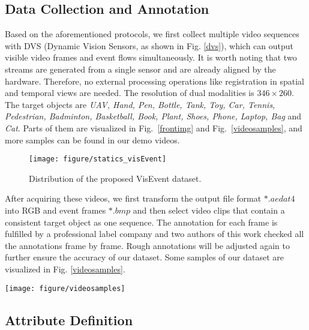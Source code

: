 \documentclass[journal]{IEEEtran}
\begin{document}
\subsection{Data Collection and Annotation} 
Based on the aforementioned protocols, we first collect multiple video sequences with DVS (Dynamic Vision Sensors, as shown in Fig. \ref{dvs}), which can output visible video frames and event flows simultaneously. It is worth noting that two streams are generated from a single sensor and are already aligned by the hardware. Therefore, no external processing operations like registration in spatial and temporal views are needed. The resolution of dual modalities is $346 \times 260$. The target objects are \emph{UAV, Hand, Pen, Bottle, Tank, Toy, Car, Tennis, Pedestrian, Badminton, Basketball, Book, Plant, Shoes, Phone, Laptop, Bag} and \emph{Cat}. Parts of them are visualized in Fig.~\ref{frontimg} and Fig.~\ref{videosamples}, and more samples can be found in our demo videos.   




\begin{figure}
\center
\texttt{[image: figure/statics\_visEvent]}
\caption{Distribution of the proposed VisEvent dataset.}
\label{staticsvisEvent}
\end{figure} 




After acquiring these videos, we first transform the output file format $*.aedat4$ into RGB and event frames $*.bmp$ and then select video clips that contain a consistent target object as one sequence. The annotation for each frame is fulfilled by a professional label company and two authors of this work checked all the annotations frame by frame. Rough annotations will be adjusted again to further ensure the accuracy of our dataset. Some samples of our dataset are visualized in Fig. \ref{videosamples}.  


\begin{figure*}[!htb]
\center
\texttt{[image: figure/videosamples]}
\caption{Representative samples of our newly proposed VisEvent tracking dataset.} 
\label{videosamples}
\end{figure*} 	





\subsection{Attribute Definition} 
\end{document}
